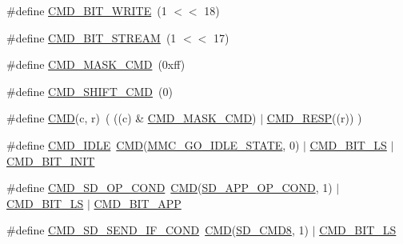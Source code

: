 \begin{DoxyCompactItemize}
\item 
\#define \hyperlink{group___s_d_m_m_c__18_x_x__43_x_x_ga78e0e4e25dd9e13cdcbecc9f396b2150}{C\+M\+D\+\_\+\+B\+I\+T\+\_\+\+W\+R\+I\+TE}~(1 $<$$<$ 18)
\item 
\#define \hyperlink{group___s_d_m_m_c__18_x_x__43_x_x_gac06479d45fc4fe15b781511aad1a0be9}{C\+M\+D\+\_\+\+B\+I\+T\+\_\+\+S\+T\+R\+E\+AM}~(1 $<$$<$ 17)
\item 
\#define \hyperlink{group___s_d_m_m_c__18_x_x__43_x_x_ga4deae38df91e0463b20ecea8837c364d}{C\+M\+D\+\_\+\+M\+A\+S\+K\+\_\+\+C\+MD}~(0xff)
\item 
\#define \hyperlink{group___s_d_m_m_c__18_x_x__43_x_x_ga137c06d8ffe0a07f89a1c64b6c9cbee6}{C\+M\+D\+\_\+\+S\+H\+I\+F\+T\+\_\+\+C\+MD}~(0)
\item 
\#define \hyperlink{group___s_d_m_m_c__18_x_x__43_x_x_ga7caafa608408eea45aca375d0d5eb211}{C\+MD}(c,  r)~( ((c) \&  \hyperlink{group___s_d_m_m_c__18_x_x__43_x_x_ga4deae38df91e0463b20ecea8837c364d}{C\+M\+D\+\_\+\+M\+A\+S\+K\+\_\+\+C\+MD}) $\vert$ \hyperlink{group___s_d_m_m_c__18_x_x__43_x_x_ga91c1b8c0d47030e80d4ff6259b169175}{C\+M\+D\+\_\+\+R\+E\+SP}((r)) )
\item 
\#define \hyperlink{group___s_d_m_m_c__18_x_x__43_x_x_ga433697a25587c6ffe8a14f02e5be9066}{C\+M\+D\+\_\+\+I\+D\+LE}~\hyperlink{group___s_d_m_m_c__18_x_x__43_x_x_ga7caafa608408eea45aca375d0d5eb211}{C\+MD}(\hyperlink{group___c_h_i_p___s_d_m_m_c___definitions_ga8cf3224a23122ebda44e49c946adfd04}{M\+M\+C\+\_\+\+G\+O\+\_\+\+I\+D\+L\+E\+\_\+\+S\+T\+A\+TE}, 0) $\vert$ \hyperlink{group___s_d_m_m_c__18_x_x__43_x_x_gac7c44bedf5c41fd5ed18712aa2ef69a7}{C\+M\+D\+\_\+\+B\+I\+T\+\_\+\+LS}    $\vert$ \hyperlink{group___s_d_m_m_c__18_x_x__43_x_x_gaddd67f85312e1b1fb2d2a83a540a4427}{C\+M\+D\+\_\+\+B\+I\+T\+\_\+\+I\+N\+IT}
\item 
\#define \hyperlink{group___s_d_m_m_c__18_x_x__43_x_x_gaee7f64b9f91e537c837702cfb4417994}{C\+M\+D\+\_\+\+S\+D\+\_\+\+O\+P\+\_\+\+C\+O\+ND}~\hyperlink{group___s_d_m_m_c__18_x_x__43_x_x_ga7caafa608408eea45aca375d0d5eb211}{C\+MD}(\hyperlink{group___c_h_i_p___s_d_m_m_c___definitions_ga612ec5173527128c99c16e0f4bb2299d}{S\+D\+\_\+\+A\+P\+P\+\_\+\+O\+P\+\_\+\+C\+O\+ND}, 1)      $\vert$ \hyperlink{group___s_d_m_m_c__18_x_x__43_x_x_gac7c44bedf5c41fd5ed18712aa2ef69a7}{C\+M\+D\+\_\+\+B\+I\+T\+\_\+\+LS} $\vert$ \hyperlink{group___s_d_m_m_c__18_x_x__43_x_x_ga201daaaa1ac9cd5e8e9c6cc3a1472038}{C\+M\+D\+\_\+\+B\+I\+T\+\_\+\+A\+PP}
\item 
\#define \hyperlink{group___s_d_m_m_c__18_x_x__43_x_x_ga6451511e7e82990e42b362a3a4b7ad77}{C\+M\+D\+\_\+\+S\+D\+\_\+\+S\+E\+N\+D\+\_\+\+I\+F\+\_\+\+C\+O\+ND}~\hyperlink{group___s_d_m_m_c__18_x_x__43_x_x_ga7caafa608408eea45aca375d0d5eb211}{C\+MD}(\hyperlink{group___c_h_i_p___s_d_m_m_c___definitions_ga43d18e10a9e461ee16164a7e315df427}{S\+D\+\_\+\+C\+M\+D8}, 1)      $\vert$ \hyperlink{group___s_d_m_m_c__18_x_x__43_x_x_gac7c44bedf5c41fd5ed18712aa2ef69a7}{C\+M\+D\+\_\+\+B\+I\+T\+\_\+\+LS}

\end{DoxyCompactItemize}

